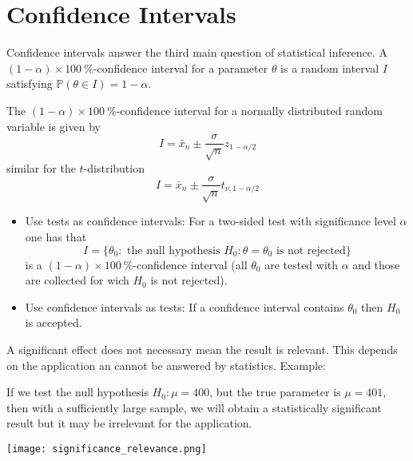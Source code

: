 \section{Confidence Intervals}
Confidence intervals answer the third main question of statistical inference.
A $(1-\alpha)\times 100\:\%$-confidence interval for a parameter $\theta$ is a random interval $I$ satisfying $\mathbb{P}(\theta\in I)=1-\alpha$.

The $(1-\alpha)\times 100\:\%$-confidence interval for a normally distributed random variable is given by
\begin{equation*}
    I=\bar{x}_n \pm \frac{\sigma}{\sqrt{n}}z_{1-\alpha/2}
\end{equation*}
similar for the $t$-distribution
\begin{equation*}
    I=\bar{x}_n \pm \frac{\sigma}{\sqrt{n}}t_{\nu,1-\alpha/2}
\end{equation*}

\newpar{}

\begin{itemize}
    \item Use tests as confidence intervals: For a two-sided test with significance level $\alpha$ one has that
    \begin{equation*}
        I=\{\theta_0:\text{ the null hypothesis }H_0\colon\theta=\theta_0\text{ is not rejected}\}
    \end{equation*}
    is a $(1-\alpha)\times 100\:\%$-confidence interval (all $\theta_0$ are tested with $\alpha$ and those are collected for wich $H_0$ is not rejected).
    \item Use confidence intervals as tests: If a confidence interval contains $\theta_0$ then $H_0$ is accepted.
\end{itemize}

\newpar{}

A significant effect does not necessary mean the result is relevant. This depends on the application an cannot be answered by statistics.
\newpar{}
Example:

If we test the null hypothesis $H_0:\mu=400$, but the true parameter is $\mu=401$, then with a sufficiently large sample, we will obtain a statistically significant result but it may be irrelevant for the application.

\begin{center}
    \texttt{[image: significance\_relevance.png]}
\end{center}


